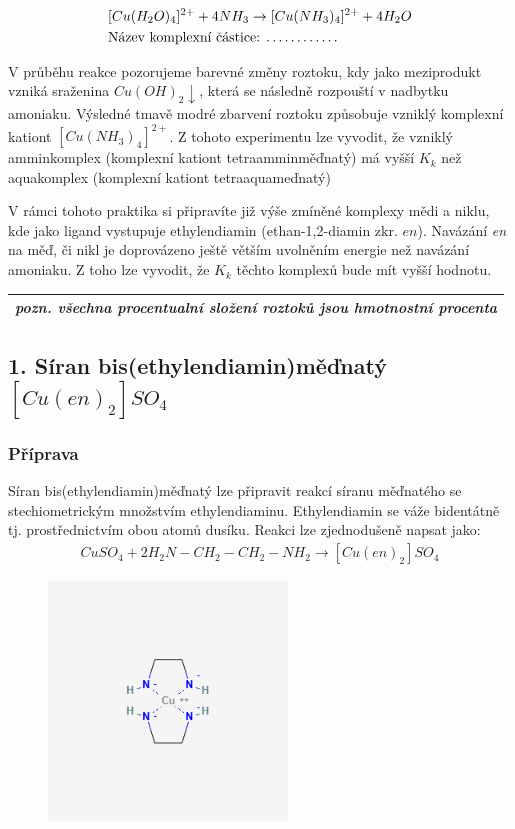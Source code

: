 \documentclass[13pt, a4paper, twoside]{article}
\begin{document}
\begin{align*}
    &[Cu(H_2O)_4]^{2+} + 4NH_3 \to [Cu(NH_3)_4]^{2+} + 4H_2O\\
    &\text{Název komplexní částice: \dots\dots\dots\dots}
\end{align*}

V průběhu reakce pozorujeme barevné změny roztoku, kdy jako meziprodukt vzniká sraženina $Cu(OH)_2 \downarrow$, která se následně rozpouští v nadbytku amoniaku. Výsledné tmavě modré
zbarvení roztoku způsobuje vzniklý komplexní kationt $[Cu(NH_3)_4]^{2+}$. Z tohoto experimentu lze vyvodit, že vzniklý amminkomplex (komplexní kationt tetraamminměďnatý) má
vyšší $K_k$ než aquakomplex (komplexní kationt tetraaquameďnatý)

V rámci tohoto praktika si připravíte již výše zmíněné komplexy mědi a niklu, kde jako ligand vystupuje ethylendiamin (ethan-1,2-diamin zkr. $en$). Navázání \emph{en} na měď, či nikl 
je doprovázeno ještě větším uvolněním energie než navázání amoniaku. Z toho lze vyvodit, že $K_k$ těchto komplexů bude mít vyšší hodnotu.

\begin{center}
\begin{tabular}{|c|}
    \hline
    \emph{pozn. všechna procentualní složení roztoků jsou hmotnostní procenta}\\
    \hline
\end{tabular}
\end{center}

\subsection*{1. Síran bis(ethylendiamin)měďnatý $[Cu(en)_2]SO_4$}
\subsubsection*{Příprava}
Síran bis(ethylendiamin)měďnatý lze připravit reakcí síranu měďnatého se stechiometrickým množstvím ethylendiaminu. 
Ethylendiamin se váže bidentátně tj. prostřednictvím obou atomů dusíku.
Reakci lze zjednodušeně napsat jako:
\begin{align*}
    CuSO_4 + 2H_2N-CH_2-CH_2-NH_2 \to [Cu(en)_2]SO_4
\end{align*}

\begin{figure}[H]
    \centering
    \includegraphics*[width=2.5in]{copperII.png}
\end{figure}
\end{document}
